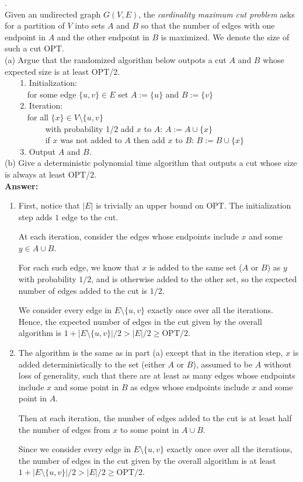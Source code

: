 \documentclass[a4paper,11pt]{article}
\begin{document}
.\\
Given an undirected graph $G(V,E)$, the {\em cardinality maximum cut problem} 
asks for a partition of $V$ into sets $A$ and $B$ 
so that the number of edges with one endpoint in $A$ and the other endpoint in $B$ is maximized. 
We denote the size of such a cut OPT.\\
(a)  Argue that the randomized algorithm below outpots a cut $A$ and $B$ whose expected size is at least OPT/2.\\
$~~~~~~~$ 1. Initialization:\\
$~~~~~~~~~~~$ for some edge $\{ u , v \} \in E$ set $A:= \{ u \}$ and $B:= \{ v \}$ \\
$~~~~~~~$ 2. Iteration: \\
$~~~~~~~~~~~$ for all $\{ x \} \in V \setminus \{ u, v \}$ \\
$~~~~~~~~~~~~~~~~~~~~~$ with probability 1/2 add $x$ to $A$:  $A:= A \cup \{ x \}$\\
$~~~~~~~~~~~~~~~~~~~~~$ if $x$ was not added to $A$ then add $x$ to $B$: $B:= B \cup \{ x \}$\\
$~~~~~~~$ 3. Output $A$ and $B$.\\
(b) Give a deterministic polynomial time algorithm that outputs a cut whose size is always at least OPT/2.\\

\noindent
{\bf Answer:}
\begin{enumerate}[label=(\alph*)]
    \item
        First, notice that $|E|$ is trivially an upper bound on $\mathrm{OPT}$. The initialization step adds $1$ edge to the cut. \par
        At each iteration, consider the edges whose endpoints include $x$ and some $y \in A \cup B$. \par
        For each such edge, we know that $x$ is added to the same set ($A$ or $B$) as $y$ with probability $1/2$, and is otherwise added to the other set, so the expected number of edges added to the cut is $1/2$. \par
        We consider every edge in $E \setminus \{u, v\}$ exactly once over all the iterations. Hence, the expected number of edges in the cut given by the overall algorithm is $1 + |E \setminus \{u, v\}|/2 > |E|/2 \geq \mathrm{OPT}/2$.
    \item
        The algorithm is the same as in part (a) except that in the iteration step, $x$ is added deterministically to the set (either $A$ or $B$), assumed to be $A$ without loss of generality, such that there are at least as many edges whose endpoints include $x$ and some point in $B$ as edges whose endpoints include $x$ and some point in $A$. \par
        Then at each iteration, the number of edges added to the cut is at least half the number of edges from $x$ to some point in $A \cup B$. \par
        Since we consider every edge in $E \setminus \{u, v\}$ exactly once over all the iterations, the number of edges in the cut given by the overall algorithm is at least $1 + |E \setminus \{u, v\}|/2 > |E|/2 \geq \mathrm{OPT}/2$.
\end{enumerate}
\end{document}
